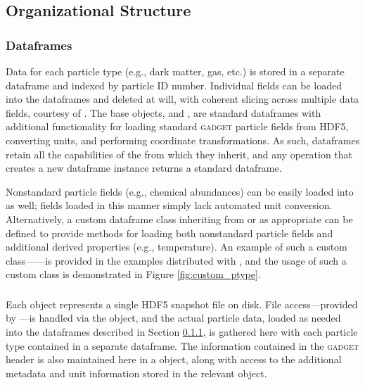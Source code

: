 \subsection{Organizational Structure}
\label{sec:hierarchy}

\subsubsection{ Dataframes}
\label{sec:df}
Data for each particle type (e.g., dark matter, gas, etc.) is stored in a separate  dataframe and indexed by particle ID number. 
Individual fields can be loaded into the dataframes and deleted at will, with coherent slicing across multiple data fields, courtesy of .  
The base  objects,  and , are standard  dataframes with additional functionality for loading standard \textsc{gadget} particle fields from HDF5, converting units, and performing coordinate transformations.  
As such,  dataframes retain all the capabilities of the  from which they inherit, and any operation that creates a new dataframe instance returns a standard  dataframe.  

Nonstandard particle fields (e.g., chemical abundances) can be easily loaded into  as well; fields loaded in this manner simply lack automated unit conversion.
Alternatively, a custom dataframe class inheriting from  or  as appropriate can be defined to provide methods for loading both nonstandard particle fields and additional derived properties (e.g., temperature). An example of such a custom class------is provided in the examples distributed with , and the usage of such a custom class is demonstrated in Figure \ref{fig:custom_ptype}.

\subsubsection{}
\label{sec:snap}
Each  object represents a single HDF5 snapshot file on disk.  File access---provided by  \citep{h5py}---is handled via the  object, and the actual particle data, loaded as needed into the  dataframes described in Section \ref{sec:df}, is gathered here with each particle type contained in a separate  dataframe.  
The information contained in the \textsc{gadget} header is also maintained here in a  object, along with access to the additional metadata and unit information stored in the relevant  object.


